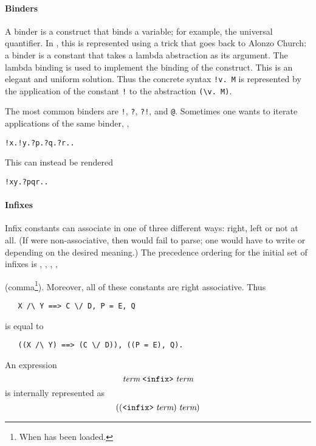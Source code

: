 {\paragraph{Binders}

A binder is a construct that binds a variable; for example, the
universal quantifier. In \HOL, this is represented using a trick that
goes back to Alonzo Church: a binder is a constant that takes a lambda
abstraction as its argument. The lambda binding is used to implement
the binding of the construct. This is an elegant and uniform solution.
Thus the concrete syntax \verb+!v. M+ is represented by the
application of the constant \verb+!+ to the abstraction \verb+(\v. M)+.

The most common binders are \verb+!+, \verb+?+, \verb+?!+, and
\verb+@+. Sometimes one wants to iterate applications of the same
binder, \eg,
\begin{alltt}
   !x. !y. ?p. ?q. ?r. \term.
\end{alltt}
This can instead be rendered
\begin{alltt}
   !x y. ?p q r. \term.
\end{alltt}

\paragraph{Infixes}

Infix constants can associate in one of three different ways: right,
left or not at all.  (If \holtxt{+} were non-associative, then
 would fail to parse; one would have to write
 or  depending on the desired
meaning.)  The precedence ordering for the initial set of infixes is
\holtxt{/\bs}, \holtxt{\bs/}, \holtxt{==>}, \holtxt{=},
\begin{Large}\holtxt{,}\end{Large} (comma\footnote{When
   has been loaded.}). Moreover, all of these
constants are right associative. Thus
\begin{hol}
\begin{verbatim}
   X /\ Y ==> C \/ D, P = E, Q
\end{verbatim}
\end{hol}
%
is equal to
%
\begin{hol}
\begin{verbatim}
   ((X /\ Y) ==> (C \/ D)), ((P = E), Q).
\end{verbatim}
\end{hol}
%
\noindent An expression
\[
\term \; \holtxt{<infix>}\; \term
\]
is internally represented as
\[
((\holtxt{<infix>}\; \term)\; \term)
\]

}
